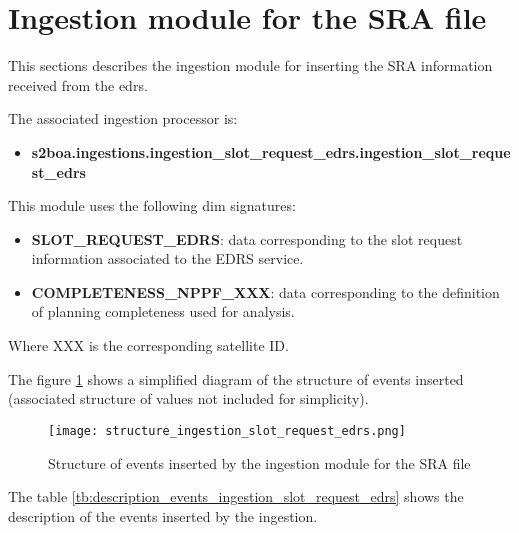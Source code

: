 \section{Ingestion module for the SRA file}

This sections describes the ingestion module for inserting the SRA information received from the \acrshort{edrs}.

The associated ingestion processor is:

\begin{itemize} 

\item \textbf{s2boa.ingestions.ingestion\_slot\_request\_edrs.ingestion\_slot\_request\_edrs}
  
\end{itemize}

This module uses the following \acrshort{dim} signatures:

\begin{itemize} 

\item \textbf{SLOT\_REQUEST\_EDRS}: data corresponding to the slot request information associated to the EDRS service.

\item \textbf{COMPLETENESS\_NPPF\_XXX}: data corresponding to the definition of planning completeness used for analysis.
  
\end{itemize}

Where XXX is the corresponding satellite ID.

The figure \ref{fg:structure_ingestion_slot_request_edrs} shows a simplified diagram of the structure of events inserted (associated structure of values not included for simplicity).

\begin{figure}[H]
  \begin{center}
	\centering\texttt{[image: structure\_ingestion\_slot\_request\_edrs.png]}
	\caption{Structure of events inserted by the ingestion module for the SRA file}
	\label{fg:structure_ingestion_slot_request_edrs}
  \end{center}
\end{figure}

The table \ref{tb:description_events_ingestion_slot_request_edrs} shows the description of the events inserted by the ingestion.

